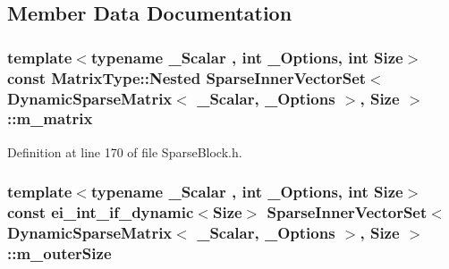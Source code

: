 \subsection{Member Data Documentation}
\hypertarget{class_sparse_inner_vector_set_3_01_dynamic_sparse_matrix_3_01___scalar_00_01___options_01_4_00_01_size_01_4_a1e453ef7a0b6c4975644e4a8f9df467b}{
\subsubsection[{m\-\_\-matrix}]{\setlength{\rightskip}{0pt plus 5cm}template$<$typename \-\_\-\-Scalar , int \-\_\-\-Options, int Size$>$ const Matrix\-Type\-::\-Nested {\bf Sparse\-Inner\-Vector\-Set}$<$ {\bf Dynamic\-Sparse\-Matrix}$<$ \-\_\-\-Scalar, \-\_\-\-Options $>$, Size $>$\-::m\-\_\-matrix\hspace{0.3cm}{\ttfamily [protected]}}}\label{class_sparse_inner_vector_set_3_01_dynamic_sparse_matrix_3_01___scalar_00_01___options_01_4_00_01_size_01_4_a1e453ef7a0b6c4975644e4a8f9df467b}


Definition at line 170 of file Sparse\-Block.\-h.

\hypertarget{class_sparse_inner_vector_set_3_01_dynamic_sparse_matrix_3_01___scalar_00_01___options_01_4_00_01_size_01_4_a9a94fe09136686d025654191e18aa85f}{
\subsubsection[{m\-\_\-outer\-Size}]{\setlength{\rightskip}{0pt plus 5cm}template$<$typename \-\_\-\-Scalar , int \-\_\-\-Options, int Size$>$ const ei\-\_\-int\-\_\-if\-\_\-dynamic$<$Size$>$ {\bf Sparse\-Inner\-Vector\-Set}$<$ {\bf Dynamic\-Sparse\-Matrix}$<$ \-\_\-\-Scalar, \-\_\-\-Options $>$, Size $>$\-::m\-\_\-outer\-Size\hspace{0.3cm}{\ttfamily [protected]}}}\label{class_sparse_inner_vector_set_3_01_dynamic_sparse_matrix_3_01___scalar_00_01___options_01_4_00_01_size_01_4_a9a94fe09136686d025654191e18aa85f}


